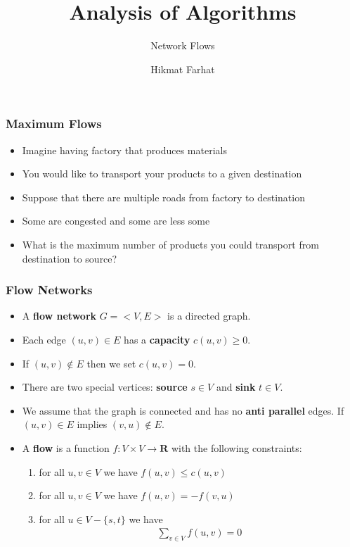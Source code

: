 \documentclass{beamer}
\title{ Analysis of Algorithms}
\subtitle{Network Flows}
\author{Hikmat Farhat}
\newcommand{\set}[1]{\ensuremath{\{#1\}}}
\begin{document}
\frame{\titlepage}

\begin{frame}
  \frametitle{Maximum Flows}
\begin{itemize}
  \item Imagine having factory that produces materials
  \item You would like to transport your products to a given destination
  \item Suppose that there are multiple roads from factory to destination
  \item Some are congested and some are less some
  \item What is the maximum number of products you could transport from destination to source?
\end{itemize}
  

\end{frame}  
\begin{frame}
  \frametitle{Flow Networks}
\begin{itemize}
  \item A \textbf{flow network} $G=<V,E>$ is a directed graph.
  \item Each edge $(u,v)\in E$ has a \textbf{capacity} $c(u,v)\ge 0$.
  \item If $(u,v)\notin E$ then we set $c(u,v)=0$.
  \item There are two special vertices: \textbf{source} $s\in V$ and \textbf{sink} $t\in V$.
  \item We assume that the graph is connected and has no \textbf{anti parallel} edges. If $(u,v)\in E$ implies $(v,u)\notin E$.
  \item A \textbf{flow} is a function $f:V\times V\rightarrow \mathbf{R}$ with the following constraints:
  \begin{enumerate}
    \item for all $u,v\in V$ we have $f(u,v)\le c(u,v)$
    \item for all $u,v\in V$ we have $f(u,v)=-f(v,u)$
    \item for all $u\in V-\set{s,t}$ we have
    \begin{align*}
      \sum_{v\in V}f(u,v)=0
    \end{align*}
  \end{enumerate}
\end{itemize}
  

\end{frame}
\end{document}
